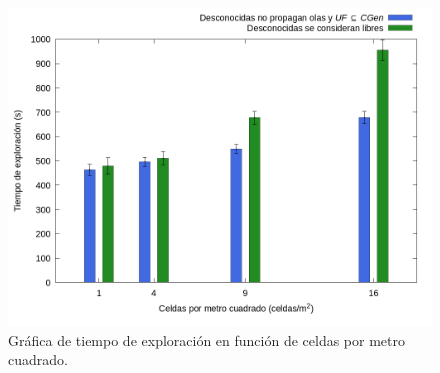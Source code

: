 






\begin{figure}[H]
  \centerfloat

  \includegraphics[clip=true, width=\graphlen]{imagenes/graficas_chicas/graficas_histo_num/desconocido/exploration_time.png}

  \caption{Gráfica de tiempo de exploración en función de celdas por metro cuadrado.}\label{fig:gra:des:et}

\end{figure}

